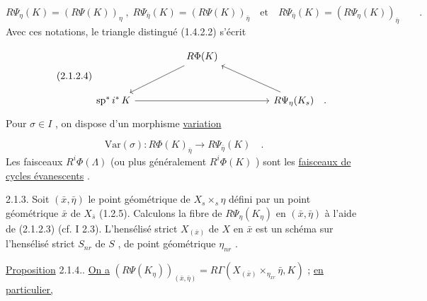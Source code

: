 \begin{equation*}
R\Psi_{\eta}(K) = (R\Psi(K))_{\eta} \;,\; R\Psi_{\bar{\eta}}(K) = (R\Psi(K))_{\bar{\eta}} \quad \text{et} \quad R\Psi_{\bar{\eta}}(K) = (R\Psi_{\eta}(K))_{\bar{\eta}} \qquad .
\end{equation*}
Avec ces notations, le triangle distingué (1.4.2.2) s'écrit 



\begin{equation}\tag{2.1.2.4}
\begin{tikzcd}[row sep=large, column sep=huge]
{} & R\Phi(K) \arrow[dl] & {} \\
\mathrm{sp}^*\, i^*\, K \arrow[rr] & {} & R\Psi_\eta(K_s) \arrow[ul] \quad .
\end{tikzcd}
\end{equation}
Pour $\sigma \in I$ , on dispose d'un morphisme \underline{variation}

\begin{equation}\tag{2.1.2.5}
\mathrm{Var}(\sigma) : R\Phi(K)_{\bar\eta} \longrightarrow R\Psi_{\bar\eta}(K) \quad .
\end{equation}
Les faisceaux $R^i\Phi(\Lambda)$ (ou plus généralement $R^i\Phi(K)$ ) sont les \underline{faisceaux de cycles évanescents} .

2.1.3. Soit $(\bar x, \bar\eta)$ le point géométrique de $X_s \times_s \eta$ défini par un point géométrique $\bar x$ de $X_{\bar s}$ (1.2.5). Calculons la fibre de $R\Psi_\eta(K_\eta)$ en $(\bar x, \bar\eta)$ à l'aide de (2.1.2.3) (cf. I 2.3). L'hensélisé strict $X_{(\bar x)}$ de $X$ en $\bar x$ est un schéma sur l'hensélisé strict $S_{nr}$ de $S$ , de point géométrique $\eta_{nr}$ .

\underline{Proposition} 2.1.4.. \underline{On a} $(R\Psi(K_\eta))_{(\bar x,\bar\eta)} = R\Gamma(X_{(\bar x)} \times_{\eta_{xr}} \bar\eta , K)$ ; \underline{en particulier,}

